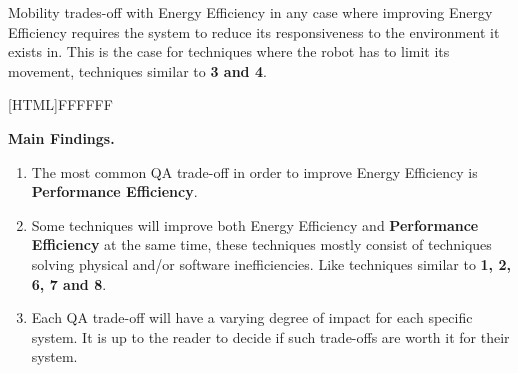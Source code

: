 Mobility trades-off with Energy Efficiency in any case where improving Energy Efficiency requires the system to reduce its responsiveness to 
the environment it exists in. This is the case for techniques where the robot has to limit its movement, techniques similar to \textbf{3 and 4}.

\vspace{2mm}

\noindent{}[HTML]{FFFFFF}{\parbox{0.47\textwidth}{%
\noindent \textbf{Main Findings.}
\begin{enumerate}[nolistsep]
\item The most common QA trade-off in order to improve Energy Efficiency is \textbf{Performance Efficiency}.
\item Some techniques will improve both Energy Efficiency and \textbf{Performance Efficiency} at the same time, 
these techniques mostly consist of techniques solving physical and/or software inefficiencies.
Like techniques similar to \textbf{1, 2, 6, 7 and 8}.
\item Each QA trade-off will have a varying degree of impact for each specific system. 
It is up to the reader to decide if such trade-offs are worth it for their system.
\end{enumerate}}}
